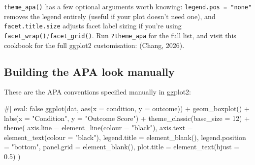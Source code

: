 \documentclass[
  letterpaper,
  DIV=11,
  numbers=noendperiod]{scrreprt}
\newenvironment{Shaded}{\begin{snugshade}}{\end{snugshade}}
\newcommand{\AttributeTok}[1]{\textcolor[rgb]{0.40,0.45,0.13}{#1}}
\newcommand{\CommentTok}[1]{\textcolor[rgb]{0.37,0.37,0.37}{#1}}
\newcommand{\DecValTok}[1]{\textcolor[rgb]{0.68,0.00,0.00}{#1}}
\newcommand{\FloatTok}[1]{\textcolor[rgb]{0.68,0.00,0.00}{#1}}
\newcommand{\FunctionTok}[1]{\textcolor[rgb]{0.28,0.35,0.67}{#1}}
\newcommand{\NormalTok}[1]{\textcolor[rgb]{0.00,0.23,0.31}{#1}}
\newcommand{\SpecialCharTok}[1]{\textcolor[rgb]{0.37,0.37,0.37}{#1}}
\newcommand{\StringTok}[1]{\textcolor[rgb]{0.13,0.47,0.30}{#1}}
\begin{document}
\begin{tcolorbox}[enhanced jigsaw, toprule=.15mm, coltitle=black, colframe=quarto-callout-tip-color-frame, colbacktitle=quarto-callout-tip-color!10!white, opacityback=0, left=2mm, breakable, rightrule=.15mm, bottomrule=.15mm, leftrule=.75mm, titlerule=0mm, arc=.35mm, opacitybacktitle=0.6, toptitle=1mm, bottomtitle=1mm, title=\textcolor{quarto-callout-tip-color}{\faLightbulb}\hspace{0.5em}{Tip}, colback=white]

\texttt{theme\_apa()} has a few optional arguments worth knowing:
\texttt{legend.pos\ =\ "none"} removes the legend entirely (useful if
your plot doesn't need one), and \texttt{facet.title.size} adjusts facet
label sizing if you're using
\texttt{facet\_wrap()}/\texttt{facet\_grid()}. Run \texttt{?theme\_apa}
for the full list, and visit this cookbook for the full ggplot2
customisation: (Chang, 2026).

\end{tcolorbox}

\subsection{Building the APA look
manually}\label{building-the-apa-look-manually}

These are the APA conventions specified manually in ggplot2:

\begin{Shaded}
\begin{Highlighting}[]
\CommentTok{\#| eval: false}
\FunctionTok{ggplot}\NormalTok{(dat, }\FunctionTok{aes}\NormalTok{(}\AttributeTok{x =}\NormalTok{ condition, }\AttributeTok{y =}\NormalTok{ outcome)) }\SpecialCharTok{+}
  \FunctionTok{geom\_boxplot}\NormalTok{() }\SpecialCharTok{+}
  \FunctionTok{labs}\NormalTok{(}\AttributeTok{x =} \StringTok{"Condition"}\NormalTok{, }\AttributeTok{y =} \StringTok{"Outcome Score"}\NormalTok{) }\SpecialCharTok{+}
  \FunctionTok{theme\_classic}\NormalTok{(}\AttributeTok{base\_size =} \DecValTok{12}\NormalTok{) }\SpecialCharTok{+}
  \FunctionTok{theme}\NormalTok{(}
    \AttributeTok{axis.line =} \FunctionTok{element\_line}\NormalTok{(}\AttributeTok{colour =} \StringTok{"black"}\NormalTok{),}
    \AttributeTok{axis.text =} \FunctionTok{element\_text}\NormalTok{(}\AttributeTok{colour =} \StringTok{"black"}\NormalTok{),}
    \AttributeTok{legend.title =} \FunctionTok{element\_blank}\NormalTok{(),}
    \AttributeTok{legend.position =} \StringTok{"bottom"}\NormalTok{,}
    \AttributeTok{panel.grid =} \FunctionTok{element\_blank}\NormalTok{(),}
    \AttributeTok{plot.title =} \FunctionTok{element\_text}\NormalTok{(}\AttributeTok{hjust =} \FloatTok{0.5}\NormalTok{)}
\NormalTok{  )}
\end{Highlighting}
\end{Shaded}
\end{document}

